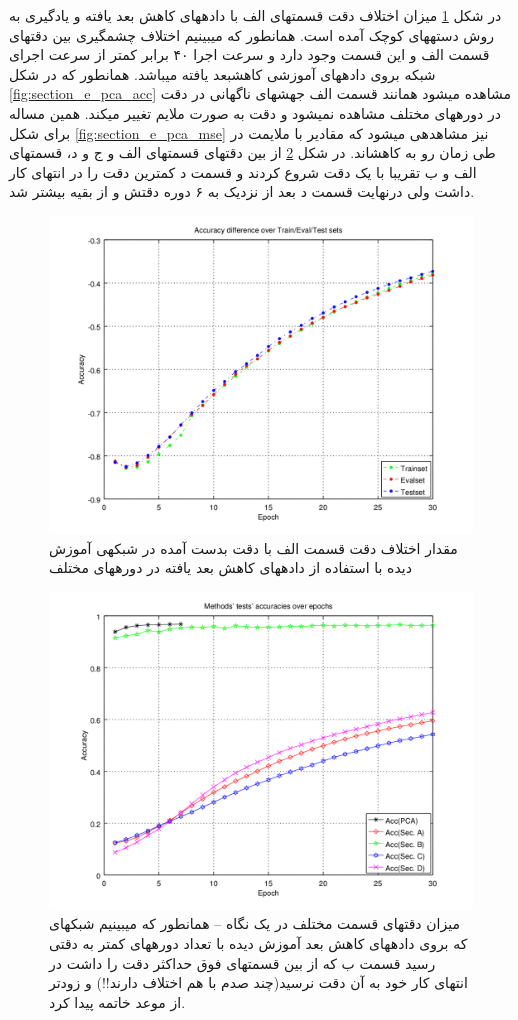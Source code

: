 \documentclass[10pt,a4paper]{article}
\newcommand{\نیمفاصله}{\halfspace}
\renewcommand{\ }{\halfspace}
\newcommand{\بپ}{انتشار-به-عقب }
\newcommand{\منست}{\lr{MNIST} }
\newcommand{\مسی}{\lr{MSE} }
\newcommand{\فوتنت}[1]{\footnote{\lr{#1}}}
\begin{document}
در شکل
\ref{fig:section_e_pca_diff_acc}
میزان اختلاف دقت قسمت\ های الف با داده\ های کاهش بعد یافته و یادگیری به روش دسته\ های کوچک آمده است. همان\ طور که می\ بینیم اختلاف چشم\ گیری بین دقت\ های قسمت الف و این قسمت وجود دارد و سرعت اجرا ۴۰ برابر کمتر از سرعت اجرای شبکه بروی داده\ های آموزشی کاهش\ بعد یافته می\ باشد. همان\ طور که در شکل
\ref{fig:section_e_pca_acc}
مشاهده می\ شود همانند قسمت الف جهش\ های ناگهانی در دقت در دوره\ های مختلف مشاهده نمی\ شود و دقت به صورت ملایم تغییر می\ کند. همین مساله برای شکل
\ref{fig:section_e_pca_mse}
نیز مشاهده\ ی می\ شود که مقادیر \مسی با ملایمت در طی زمان رو به کاهش\ اند. در شکل
\ref{fig:section_e_all_acc}
{\small
از بین دقت\ های قسمت\ های الف و ج و د، قسمت\ های  الف و ب تقریبا با یک دقت شروع کردند و قسمت د کمترین دقت را در انتهای کار داشت ولی درنهایت قسمت د بعد از نزدیک به ۶ دوره دقتش و از بقیه بیشتر شد}.
\newpage
\begin{figure}
\centering
\includegraphics[width=.85\textwidth]{5_pca_diff_acc}
\caption{مقدار اختلاف دقت قسمت الف با دقت بدست آمده در شبکه\ ی آموزش دیده با استفاده از داده\ های کاهش بعد یافته در دوره\ های مختلف}\label{fig:section_e_pca_diff_acc}
\end{figure}
\begin{figure}
\centering
\includegraphics[width=.9\textwidth]{5_all_acc}
\caption{میزان دقت\ های قسمت مختلف در یک نگاه -- همان\ طور که می\ بینیم شبکه\ ای که بروی داده\ های کاهش بعد آموزش دیده با تعداد دوره\ های کمتر به دقتی رسید قسمت ب که از بین قسمت\ های فوق حداکثر دقت را داشت در انتهای کار خود به آن دقت نرسید(چند صدم با هم اختلاف دارند!!) و زودتر از موعد خاتمه پیدا کرد. }\label{fig:section_e_all_acc}
\end{figure}
\end{document}
